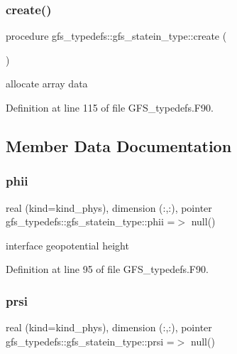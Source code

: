\subsubsection{create()}
{\footnotesize\ttfamily procedure gfs\+\_\+typedefs\+::gfs\+\_\+statein\+\_\+type\+::create (\begin{DoxyParamCaption}{ }\end{DoxyParamCaption})}



allocate array data 



Definition at line 115 of file G\+F\+S\+\_\+typedefs.\+F90.



\subsection{Member Data Documentation}
\mbox{\label{structgfs__typedefs_1_1gfs__statein__type_a3d26c3e604a433a4bffb3ba39f52ad79}} 
\subsubsection{phii}
{\footnotesize\ttfamily real (kind=kind\+\_\+phys), dimension  (\+:,\+:), pointer gfs\+\_\+typedefs\+::gfs\+\_\+statein\+\_\+type\+::phii =$>$ null()}



interface geopotential height 



Definition at line 95 of file G\+F\+S\+\_\+typedefs.\+F90.

\mbox{\label{structgfs__typedefs_1_1gfs__statein__type_a8baeba7bdd9cedbce7db96b594a736ea}} 
\subsubsection{prsi}
{\footnotesize\ttfamily real (kind=kind\+\_\+phys), dimension  (\+:,\+:), pointer gfs\+\_\+typedefs\+::gfs\+\_\+statein\+\_\+type\+::prsi =$>$ null()}




